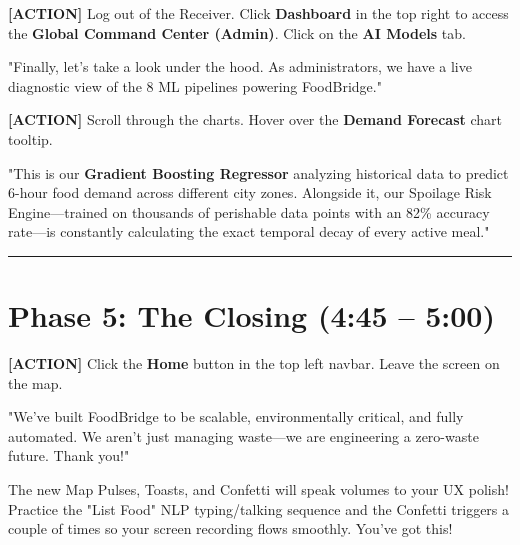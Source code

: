\documentclass[12pt,a4paper]{article}
\begin{document}
\noindent\textcolor{action}{\textbf{[ACTION]}} Log out of the Receiver. Click \textbf{Dashboard} in the top right to access the \textbf{Global Command Center (Admin)}. Click on the \textbf{AI Models} tab.

\begin{scriptbox}
"Finally, let's take a look under the hood. As administrators, we have a live diagnostic view of the 8 ML pipelines powering FoodBridge."
\end{scriptbox}

\noindent\textcolor{action}{\textbf{[ACTION]}} Scroll through the charts. Hover over the \textbf{Demand Forecast} chart tooltip.

\begin{scriptbox}
"This is our \textbf{Gradient Boosting Regressor} analyzing historical data to predict 6-hour food demand across different city zones. Alongside it, our Spoilage Risk Engine—trained on thousands of perishable data points with an 82\% accuracy rate—is constantly calculating the exact temporal decay of every active meal."
\end{scriptbox}

\vspace{1em}
\hrule
\vspace{1em}

\section*{Phase 5: The Closing (4:45 – 5:00)}

\noindent\textcolor{action}{\textbf{[ACTION]}} Click the \textbf{Home} button in the top left navbar. Leave the screen on the map.

\begin{scriptbox}
"We've built FoodBridge to be scalable, environmentally critical, and fully automated. We aren't just managing waste—we are engineering a zero-waste future. Thank you!"
\end{scriptbox}

\vspace{2em}

\begin{tipbox}
The new Map Pulses, Toasts, and Confetti will speak volumes to your UX polish! Practice the "List Food" NLP typing/talking sequence and the Confetti triggers a couple of times so your screen recording flows smoothly. You've got this!
\end{tipbox}
\end{document}
